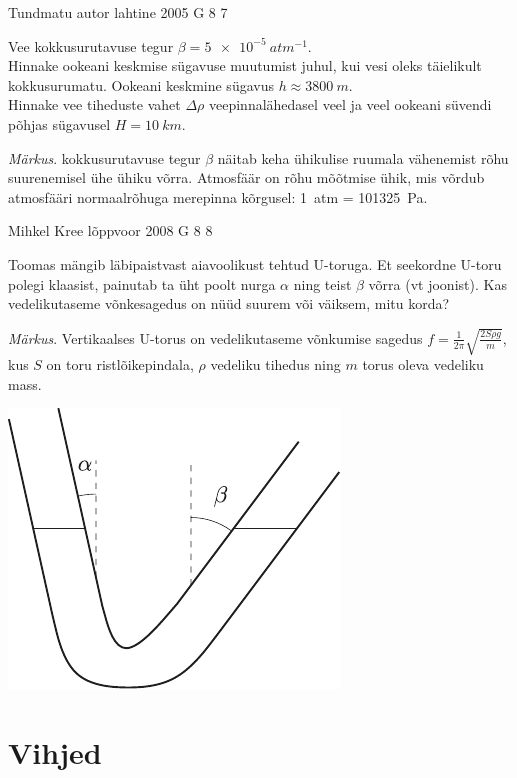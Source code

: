 \documentclass[11pt]{article}
\begin{document}
{%
{Tundmatu autor} %
{lahtine} %
{2005} %
{G 8} %
{7} %
{
\ifStatement
Vee kokkusurutavuse tegur $\beta = \SI{5e-5}{atm^{-1}}$.\\
\osa Hinnake ookeani keskmise sügavuse muutumist juhul, kui vesi oleks täielikult kokkusurumatu. Ookeani keskmine sügavus $h \approx \SI{3800}{m}$.\\
\osa Hinnake vee tiheduste vahet $\Delta \rho$ veepinnalähedasel veel ja veel ookeani süvendi põhjas sügavusel $H = \SI{10}{km}$. 

\emph{Märkus}. kokkusurutavuse tegur $\beta$ näitab keha ühikulise ruumala vähenemist rõhu suurenemisel ühe ühiku võrra. Atmosfäär on rõhu mõõtmise ühik, mis võrdub atmosfääri normaalrõhuga merepinna kõrgusel: \SI{1}{atm} = \SI{101325}{Pa}.
\fi
}

{Mihkel Kree} %
{lõppvoor} %
{2008} %
{G 8} %
{8} %
{
\ifStatement
Toomas mängib läbipaistvast aiavoolikust tehtud U-toruga. Et seekordne U-toru polegi klaasist, painutab ta üht poolt nurga $\alpha$ ning teist $\beta$ võrra (vt joonist). Kas vedelikutaseme võnkesagedus on nüüd suurem või väiksem, mitu korda? 

\emph{Märkus}. Vertikaalses U-torus on vedelikutaseme võnkumise sagedus $f = \frac{1}{2\pi} \sqrt{\frac{2S\rho g}{m}}$, kus $S$ on toru ristlõikepindala, $\rho$ vedeliku tihedus ning $m$ torus oleva vedeliku mass.

\begin{center}
	\includegraphics[width=0.5\linewidth]{2008-v3g-08-yl}
\end{center}
\fi
}
\newpage\normalsize\section{Vihjed}
        \ToggleHint
        
}
\end{document}
